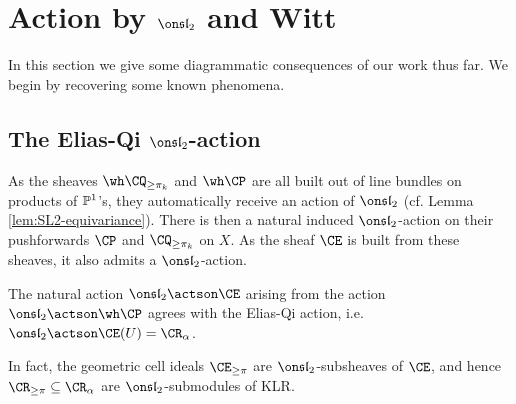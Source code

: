 \documentclass[11pt,reqno]{amsart}
\begin{document}
\section{Action by $\sl_2$ and Witt}\label{subsect:sl2actionKLR}
In this section we give some diagrammatic consequences of our work thus far. We begin by recovering some known phenomena.

\subsection{The Elias-Qi $\sl_2$-action}
As the sheaves $\wh\CQ_{\ge\pi_k}$ and $\wh\CP$ are all built out of line bundles on products of $\mathbb P^1$'s, they automatically receive an action of $\sl_2$ (cf. Lemma \ref{lem:SL2-equivariance}). There is then a natural induced $\sl_2$-action on their pushforwards $\CP$ and $\CQ_{\ge\pi_k}$ on $X$. As the sheaf $\CE$ is built from these sheaves, it also admits a $\sl_2$-action.
\begin{theorem}\label{thm:A_N sl2 action}
    The natural action $\sl_2\actson \CE$ arising from the action $\sl_2\actson \wh\CP$ agrees with the Elias-Qi action, i.e. $\sl_2\actson \CE(U)=\CR_\alpha$. 

    In fact, the geometric cell ideals $\CE_{\ge\pi}$ are $\sl_2$-subsheaves of $\CE$, and hence $\CR_{\ge\pi}\subseteq \CR_\alpha$ are $\sl_2$-submodules of KLR.
\end{theorem}
\end{document}
